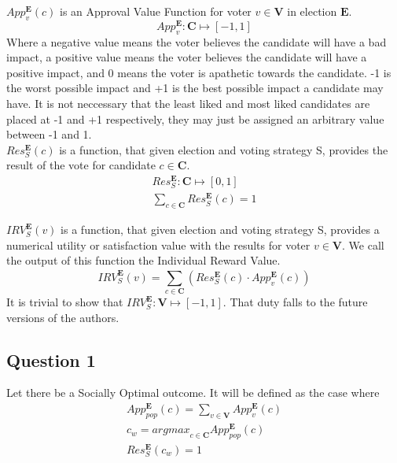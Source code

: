 \documentclass{article}
\begin{document}
$App^{\pmb{E}}_{v}(c)$ is an Approval Value Function for voter $v \in \pmb{V}$ in election $\pmb{E}$.
\begin{equation}
App^{\pmb{E}}_{v} : \pmb{C} \mapsto [-1,1]
\end{equation}
Where a negative value means the voter believes the candidate will have a bad impact, a positive value means the voter believes the candidate will have a positive impact, and 0 means the voter is apathetic towards the candidate. -1 is the worst possible impact and +1 is the best possible impact a candidate may have. It is not neccessary that the least liked and most liked candidates are placed at -1 and +1 respectively, they may just be assigned an arbitrary value between -1 and 1.\\

$Res^{\pmb{E}}_{S}(c)$ is a function, that given election  and voting strategy {S}, provides the result of the vote for candidate $c \in \pmb{C}$.
\begin{gather}
Res^{\pmb{E}}_{S} : \pmb{C} \mapsto [0,1]\\
\sum^{}_{c \in \pmb{C}}{Res^{\pmb{E}}_{S}(c)} = 1
\end{gather}

${IRV}^{\pmb{E}}_{S}(v)$ is a function, that given election  and voting strategy {S}, provides a numerical utility or satisfaction value with the results for voter $v \in \pmb{V}$. We call the output of this function the Individual Reward Value.
\begin{equation}
{IRV}^{\pmb{E}}_{S}(v) = \sum^{}_{c \in \pmb{C}}{(Res^{\pmb{E}}_{S}(c) \cdot App^{\pmb{E}}_{v}(c))}
\end{equation}
It is trivial to show that ${IRV}^{\pmb{E}}_{S} : \pmb{V} \mapsto [-1,1]$. That duty falls to the future versions of the authors.


\subsection{Question 1}

Let there be a Socially Optimal outcome. It will be defined as the case where
\begin{gather}
App^{\pmb{E}}_{pop}(c) = \sum^{}_{v \in \pmb{V}}{App^{\pmb{E}}_{v}(c)}\\
c_{w} = {argmax}_{c \in \pmb{C}} App^{\pmb{E}}_{pop}(c)\\
Res^{\pmb{E}}_{S}(c_{w}) = 1
\end{gather}\\
\end{document}
